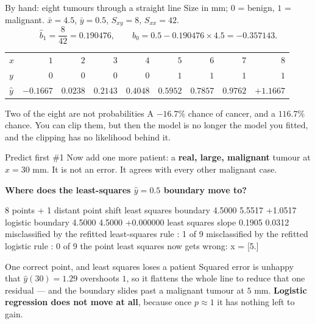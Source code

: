 \documentclass[aspectratio=169]{beamer}
\begin{document}
\begin{frame}[shrink=6]{By hand: eight tumours through a straight line}
  Size in mm; $0$ = benign, $1$ = malignant. $\bar x = 4.5$,
  $\bar y = 0.5$, $S_{xy} = 8$, $S_{xx} = 42$.
  \[
    \hat b_1 = \frac{8}{42} = 0.190476, \qquad
    \hat b_0 = 0.5 - 0.190476\times 4.5 = -0.357143 .
  \]
  \begin{center}\small
  \begin{tabular}{@{}lrrrrrrrr@{}}
    \toprule
    $x$ & $1$ & $2$ & $3$ & $4$ & $5$ & $6$ & $7$ & $8$\\
    $y$ & $0$ & $0$ & $0$ & $0$ & $1$ & $1$ & $1$ & $1$\\
    \midrule
    $\hat y$ & $\mathbf{-0.1667}$ & $0.0238$ & $0.2143$ & $0.4048$
             & $0.5952$ & $0.7857$ & $0.9762$ & $\mathbf{+1.1667}$\\
    \bottomrule
  \end{tabular}
  \end{center}
  \begin{alertblock}{Two of the eight are not probabilities}
    \small A $-16.7\%$ chance of cancer, and a $116.7\%$ chance. You can
    clip them, but then the model is no longer the model you fitted, and
    the clipping has no likelihood behind it.
  \end{alertblock}
\end{frame}

\begin{frame}[fragile,shrink=8]{Predict first \#1}
Now add one more patient: a \textbf{real, large, malignant} tumour at
$x = 30$ mm. It is not an error. It agrees with every other malignant case.

\begin{center}
  \textbf{Where does the least-squares $\hat y = 0.5$ boundary move to?}
\end{center}
\vspace{0.2em}
\begin{outblk}
                          8 points      + 1 distant point     shift
least squares boundary      4.5000             5.5517       +1.0517
logistic boundary           4.5000             4.5000      +0.000000
least squares slope         0.1905             0.0312
misclassified by the refitted least-squares rule : 1 of 9
misclassified by the refitted logistic rule      : 0 of 9
the point least squares now gets wrong: x = [5.]
\end{outblk}
\begin{alertblock}{One correct point, and least squares loses a patient}
  \footnotesize Squared error is unhappy that $\hat y(30) = 1.29$ overshoots
  $1$, so it flattens the whole line to reduce that one residual --- and the
  boundary slides past a malignant tumour at $5$ mm. \textbf{Logistic
  regression does not move at all}, because once $p \approx 1$ it has nothing
  left to gain.
\end{alertblock}
\end{frame}
\end{document}
